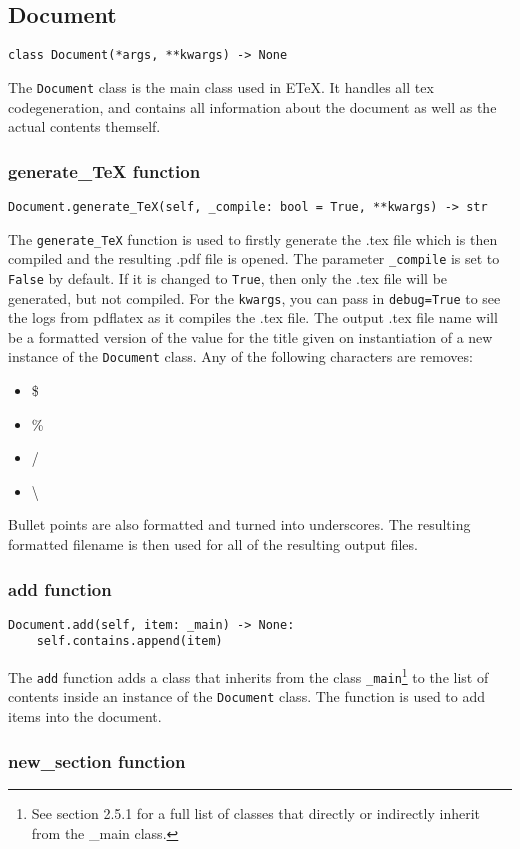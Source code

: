 \documentclass{article}
\begin{document}
\subsection[Document]{Document}
\lstset{language=Python}
\begin{lstlisting}
class Document(*args, **kwargs) -> None
\end{lstlisting}
The \verb|Document| class is the main class used in ETeX. It handles all tex codegeneration, and contains all information about the document as well as the actual contents themself.\subsubsection[generate\_TeX function]{generate\_TeX function}
\lstset{language=Python}
\begin{lstlisting}
Document.generate_TeX(self, _compile: bool = True, **kwargs) -> str
\end{lstlisting}
The \verb|generate_TeX| function is used to firstly generate the .tex file which is then compiled and the resulting .pdf file is opened. The parameter \verb|_compile| is set to \verb|False| by default. If it is changed to \verb|True|, then only the .tex file will be generated, but not compiled. For the \verb|kwargs|, you can pass in \verb|debug=True| to see the logs from pdflatex as it compiles the .tex file.
The output .tex file name will be a formatted version of the value for the title given on instantiation of a new instance of the \verb|Document| class. Any of the following characters are removes:\begin{itemize}
\item \$
\item \%
\item /
\item \textbackslash
\end{itemize}
Bullet points are also formatted and turned into underscores. The resulting formatted filename is then used for all of the resulting output files.\subsubsection[add function]{add function}
\lstset{language=Python}
\begin{lstlisting}
Document.add(self, item: _main) -> None:
	self.contains.append(item)
\end{lstlisting}
The \verb|add| function adds a class that inherits from the class \verb|_main|\footnote{See section 2.5.1 for a full list of classes that directly or indirectly inherit from the \_main class.} to the list of contents inside an instance of the \verb|Document| class. The function is used to add items into the document.\subsubsection[new\_section function]{new\_section function}
\end{document}
